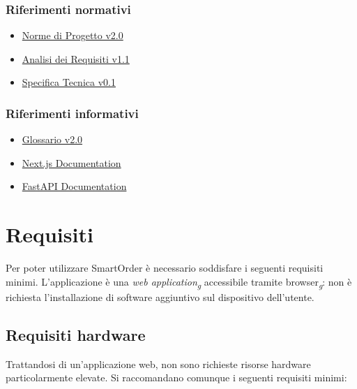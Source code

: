 \documentclass[a4paper, 11pt, oneside]{scrartcl}
\begin{document}
\subsubsection{Riferimenti normativi}
\begin{itemize}
    \item \href{https://swenightpro.github.io/Documentazione/docs/RTB/Documentazione%20Interna/Norme_di_Progetto_v2.0.pdf}{Norme di Progetto v2.0}
    \item \href{https://swenightpro.github.io/Documentazione/docs/RTB/Documentazione%20Esterna/Analisi%20dei%20Requisiti%20v1.1.pdf}{Analisi dei Requisiti v1.1}
    \item \href{https://swenightpro.github.io/Documentazione/docs/PB/Documentazione%20Esterna/Specifica%20Tecnica%20v0.1.pdf}{Specifica Tecnica v0.1}
\end{itemize}

\subsubsection{Riferimenti informativi}
\begin{itemize}
    \item \href{https://swenightpro.github.io/Documentazione/docs/RTB/Documentazione%20Esterna/Glossario_v2.0.pdf}{Glossario v2.0}
    \item \href{https://nextjs.org/docs}{Next.js Documentation}
    \item \href{https://fastapi.tiangolo.com}{FastAPI Documentation}
\end{itemize}

\newpage

\section{Requisiti}
Per poter utilizzare SmartOrder \`e necessario soddisfare i seguenti requisiti minimi. L'applicazione \`e una \textit{web application}\textsubscript{\textit{g}} accessibile tramite browser\textsubscript{\textit{g}}: non \`e richiesta l'installazione di software aggiuntivo sul dispositivo dell'utente.

\subsection{Requisiti hardware}
Trattandosi di un'applicazione web, non sono richieste risorse hardware particolarmente elevate. Si raccomandano comunque i seguenti requisiti minimi:
\end{document}
